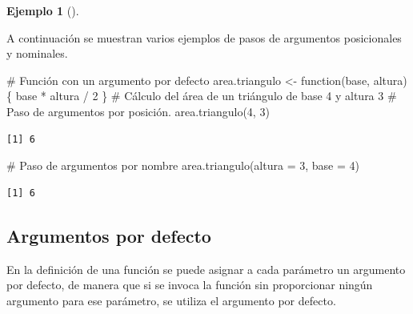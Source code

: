 \documentclass[
  a4paper,
]{scrreport}
\newenvironment{Shaded}{\begin{snugshade}}{\end{snugshade}}
\newcommand{\AttributeTok}[1]{\textcolor[rgb]{0.40,0.45,0.13}{#1}}
\newcommand{\CommentTok}[1]{\textcolor[rgb]{0.37,0.37,0.37}{#1}}
\newcommand{\ControlFlowTok}[1]{\textcolor[rgb]{0.00,0.23,0.31}{#1}}
\newcommand{\DecValTok}[1]{\textcolor[rgb]{0.68,0.00,0.00}{#1}}
\newcommand{\FunctionTok}[1]{\textcolor[rgb]{0.28,0.35,0.67}{#1}}
\newcommand{\NormalTok}[1]{\textcolor[rgb]{0.00,0.23,0.31}{#1}}
\newcommand{\OtherTok}[1]{\textcolor[rgb]{0.00,0.23,0.31}{#1}}
\newcommand{\SpecialCharTok}[1]{\textcolor[rgb]{0.37,0.37,0.37}{#1}}
\theoremstyle{definition}
\newtheorem{example}{Ejemplo}[chapter]
\theoremstyle{definition}
\theoremstyle{remark}
\begin{document}
\leavevmode{}%
\begin{example}[]\label{exm-paso-parametros-funcion}

A continuación se muestran varios ejemplos de pasos de argumentos
posicionales y nominales.

\begin{Shaded}
\begin{Highlighting}[]
\CommentTok{\# Función con un argumento por defecto}
\NormalTok{area.triangulo }\OtherTok{\textless{}{-}} \ControlFlowTok{function}\NormalTok{(base, altura) \{}
\NormalTok{  base }\SpecialCharTok{*}\NormalTok{ altura }\SpecialCharTok{/} \DecValTok{2}
\NormalTok{\}}
\CommentTok{\# Cálculo del área de un triángulo de base 4 y altura 3}
\CommentTok{\# Paso de argumentos por posición. }
\FunctionTok{area.triangulo}\NormalTok{(}\DecValTok{4}\NormalTok{, }\DecValTok{3}\NormalTok{)}
\end{Highlighting}
\end{Shaded}

\begin{verbatim}
[1] 6
\end{verbatim}

\begin{Shaded}
\begin{Highlighting}[]
\CommentTok{\# Paso de argumentos por nombre}
\FunctionTok{area.triangulo}\NormalTok{(}\AttributeTok{altura =} \DecValTok{3}\NormalTok{, }\AttributeTok{base =} \DecValTok{4}\NormalTok{)}
\end{Highlighting}
\end{Shaded}

\begin{verbatim}
[1] 6
\end{verbatim}

\end{example}

\hypertarget{argumentos-por-defecto}{%
\subsection{Argumentos por defecto}\label{argumentos-por-defecto}}

En la definición de una función se puede asignar a cada parámetro un
argumento por defecto, de manera que si se invoca la función sin
proporcionar ningún argumento para ese parámetro, se utiliza el
argumento por defecto.
\end{document}
